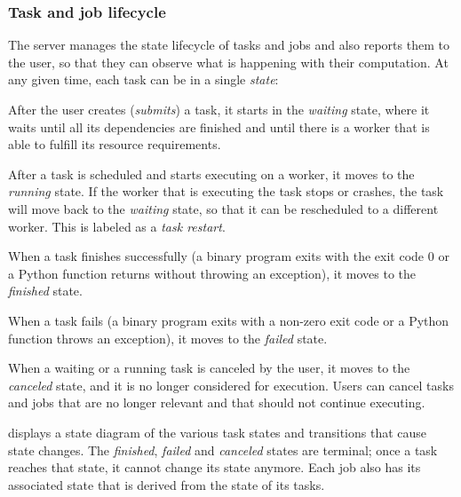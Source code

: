 \subsubsection*{Task and job lifecycle}
The server manages the state lifecycle of tasks and jobs and also reports them to the user, so that
they can observe what is happening with their computation. At any given time, each task can be in a
single \emph{state}:

\begin{description}[wide=0pt,itemsep=0pt,topsep=4pt]
	\item[Waiting] After the user creates (\emph{submits}) a task, it starts in the \emph{waiting}
		state, where it waits until all its dependencies are finished and until there is a worker that is
		able to fulfill its resource requirements.
	\item[Running] After a task is scheduled and starts executing on a worker, it moves to the \emph{running}
		state. If the worker that is executing the task stops or crashes, the task will move back to the
		\emph{waiting} state, so that it can be rescheduled to a different worker. This is labeled
		as a \emph{task restart}.
	\item[Finished] When a task finishes successfully (a binary program exits with the exit code $0$
		or a Python function returns without throwing an exception), it moves to the \emph{finished}
		state.
	\item[Failed] When a task fails (a binary program exits with a non-zero exit code or a Python function throws an
		exception), it moves to the \emph{failed} state.
	\item[Canceled] When a waiting or a running task is canceled by the user, it moves to the \emph{canceled}
		state, and it is no longer considered for execution. Users can cancel tasks and jobs that are no
		longer relevant and that should not continue executing.
\end{description}

 displays a state diagram of the various task states and
transitions that cause state changes. The \emph{finished}, \emph{failed} and
\emph{canceled} states are terminal; once a task reaches that state, it cannot change its
state anymore. Each job also has its associated state that is derived from the state of its tasks.

